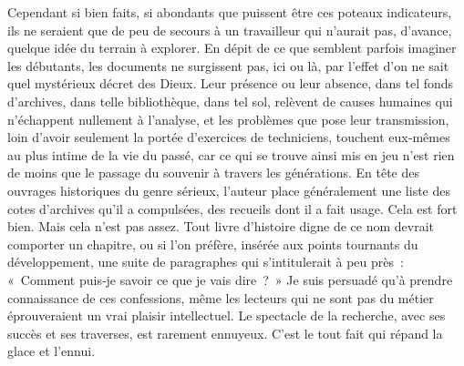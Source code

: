 \documentclass[french,twoside]{book} %
\newcommand{\astermono}{\medskip\centerline{\color{rubric}\large\selectfont{\syms ✻}}\medskip\par}%
\begin{document}
Cependant si bien faits, si abondants que puissent être ces poteaux indicateurs, ils ne seraient que de peu de secours à un travailleur qui n’aurait pas, d’avance, quelque idée du terrain à explorer. En dépit de ce que semblent parfois imaginer les débutants, les documents ne sur­gissent pas, ici ou là, par l’effet d’on ne sait quel mystérieux décret des Dieux. Leur présence ou leur absence, dans tel fonds d’archives, dans telle bibliothèque, dans tel sol, relèvent de causes humaines qui n’échap­pent nullement à l’analyse, et les problèmes que pose leur transmission,  
\label{p30} loin d’avoir seulement la portée d’exercices de techniciens, touchent eux‑mêmes au plus intime de la vie du passé, car ce qui se trouve ainsi mis en jeu n’est rien de moins que le passage du souvenir à travers les générations. En tête des ouvrages historiques du genre sérieux, l’auteur place généralement une liste des cotes d’archives qu’il a compulsées, des recueils dont il a fait usage. Cela est fort bien. Mais cela n’est pas assez. Tout livre d’histoire digne de ce nom devrait comporter un chapitre, ou si l’on préfère, insérée aux points tournants du développement, une suite de paragraphes qui s’intitulerait à peu près : « Comment puis‑je savoir ce que je vais dire ? » Je suis persuadé qu’à prendre connaissance de ces confessions, même les lecteurs qui ne sont pas du métier éprouveraient un vrai plaisir intellectuel. Le spectacle de la recherche, avec ses succès et ses traverses, est rarement ennuyeux. C’est le tout fait qui répand la glace et l’ennui.\par

\astermono
\end{document}
